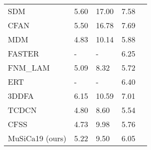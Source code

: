 \documentclass[twocolumn]{article}
\begin{document}
\begin{table}[]
\begin{tabular}{@{}llllll@{}}
\multicolumn{2}{l}{SDM \cite{xiong2013supervised}}                      & 5.60                                 & 17.00                                & 7.58                                 & \cellcolor[HTML]{0000FF}{\color[HTML]{000000} } \\
\multicolumn{2}{l}{CFAN \cite{zhang2014coarse}}                     & 5.50                                 & 16.78                                & 7.69                                 & \cellcolor[HTML]{0000FF}                        \\
\multicolumn{2}{l}{MDM \cite{trigeorgis2016mnemonic}}                      & 4.83                                 & 10.14                                & 5.88                                 & \cellcolor[HTML]{0000FF}                        \\
\multicolumn{2}{l}{FASTER \cite{duan2019faster}}                   & -                                    & -                                    & 6.25                                 & \cellcolor[HTML]{0000FF}                        \\
\multicolumn{2}{l}{FNM\_LAM \cite{liu2019efficient}}                 & 5.09                                 & 8.32                                 & 5.72                                 & \cellcolor[HTML]{0000FF}                        \\
\multicolumn{2}{l}{ERT \cite{kazemi2014one}}                      & -                                    & -                                    & 6.40                                 & \cellcolor[HTML]{0000FF}                        \\
\multicolumn{2}{l}{3DDFA \cite{zhu2016face}}                    & 6.15                                 & 10.59                                & 7.01                                 & \cellcolor[HTML]{0000FF}                        \\
\multicolumn{2}{l}{TCDCN \cite{zhang2014facial}}                    & 4.80                                 & 8.60                                 & 5.54                                 & \cellcolor[HTML]{0000FF}                        \\
\multicolumn{2}{l}{CFSS \cite{zhu2015face}}                     & 4.73                                 & 9.98                                 & 5.76                                 & \cellcolor[HTML]{0000FF} \\
\multicolumn{2}{l}{MuSiCa19 (ours)}                     & 5.22                                 & 9.50                                 & 6.05                                 & \cellcolor[HTML]{0000FF} \\

\end{tabular}
\end{table}
\end{document}
